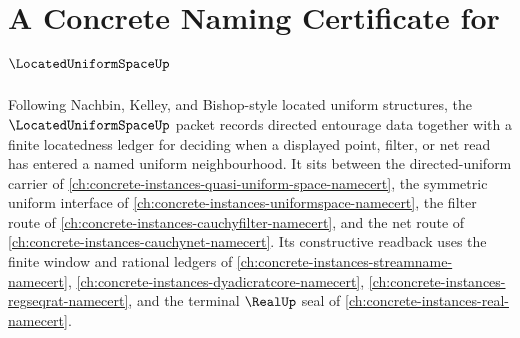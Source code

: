 \chapter{A Concrete Naming Certificate for $\LocatedUniformSpaceUp$}
\label{ch:concrete-instances-located-uniform-space-namecert}

Following Nachbin, Kelley, and Bishop-style located uniform structures, the $\LocatedUniformSpaceUp$ packet records directed entourage data together with a finite locatedness ledger for deciding when a displayed point, filter, or net read has entered a named uniform neighbourhood. It sits between the directed-uniform carrier of \autoref{ch:concrete-instances-quasi-uniform-space-namecert}, the symmetric uniform interface of \autoref{ch:concrete-instances-uniformspace-namecert}, the filter route of \autoref{ch:concrete-instances-cauchyfilter-namecert}, and the net route of \autoref{ch:concrete-instances-cauchynet-namecert}. Its constructive readback uses the finite window and rational ledgers of \autoref{ch:concrete-instances-streamname-namecert}, \autoref{ch:concrete-instances-dyadicratcore-namecert}, \autoref{ch:concrete-instances-regseqrat-namecert}, and the terminal $\RealUp$ seal of \autoref{ch:concrete-instances-real-namecert}.

